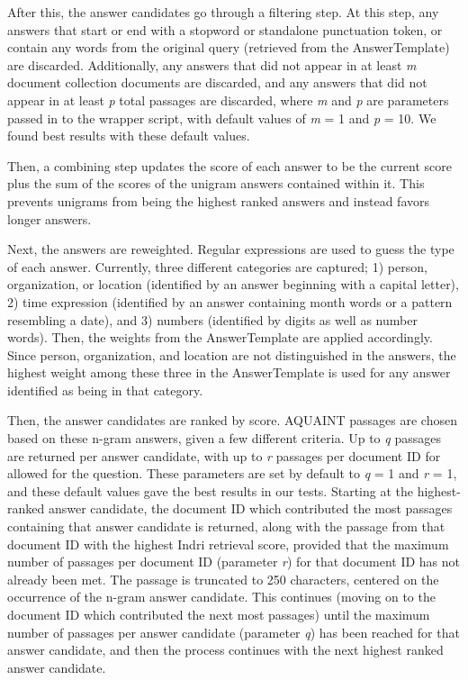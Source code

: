 \documentclass[11pt]{article}
\begin{document}
After this, the answer candidates go through a filtering step.  At this step, any answers that start or end with a stopword or standalone punctuation token, or contain any words from the original query (retrieved from the AnswerTemplate) are discarded.  Additionally, any answers that did not appear in at least \emph{m} document collection documents are discarded, and any answers that did not appear in at least \emph{p} total passages are discarded, where \emph{m} and \emph{p} are parameters passed in to the wrapper script, with default values of \emph{m} = 1 and \emph{p} = 10.  We found best results with these default values.

Then, a combining step updates the score of each answer to be the current score plus the sum of the scores of the unigram answers contained within it. This prevents unigrams from being the highest ranked answers and instead favors longer answers.

Next, the answers are reweighted.  Regular expressions are used to guess the type of each answer.  Currently, three different categories are captured; 1) person, organization, or location (identified by an answer beginning with a capital letter), 2) time expression (identified by an answer containing month words or a pattern resembling a date), and 3) numbers (identified by digits as well as number words).  Then, the weights from the AnswerTemplate are applied accordingly.  Since person, organization, and location are not distinguished in the answers, the highest weight among these three in the AnswerTemplate is used for any answer identified as being in that category.

Then, the answer candidates are ranked by score.  AQUAINT passages are chosen based on these n-gram answers, given a few different criteria.  Up to \emph{q} passages are returned per answer candidate, with up to \emph{r} passages per document ID for allowed for the question.  These parameters are set by default to \emph{q} = 1 and \emph{r} = 1, and these default values gave the best results in our tests.  Starting at the highest-ranked answer candidate, the document ID which contributed the most passages containing that answer candidate is returned, along with the passage from that document ID with the highest Indri retrieval score, provided that the maximum number of passages per document ID (parameter \emph{r}) for that document ID has not already been met.  The passage is truncated to 250 characters, centered on the occurrence of the n-gram answer candidate.  This continues (moving on to the document ID which contributed the next most passages) until the maximum number of passages per answer candidate (parameter \emph{q}) has been reached for that answer candidate, and then the process continues with the next highest ranked answer candidate.
\end{document}
